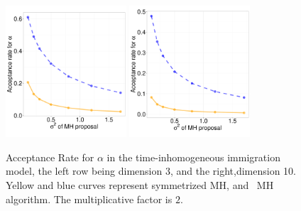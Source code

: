   \begin{figure}[H]
  \centering

  \begin{minipage}[!hp]{0.99\linewidth}
    \includegraphics [width=0.40\textwidth, angle=0]{figs/acc/CQ_D3alpha_k2.pdf}
	\hspace{.5in}
    \includegraphics [width=0.40\textwidth, angle=0]{figs/acc/CQ_D10alpha_k2.pdf}
  \end{minipage}
    \caption{Acceptance Rate for $\alpha$ in the time-inhomogeneous immigration model, the left row being dimension 3, and the right,dimension 10.  Yellow and blue curves represent symmetrized MH,
 and \naive\ MH  algorithm. The multiplicative factor is $2$. }
     \label{fig:ACC_CQ}
  \end{figure}

